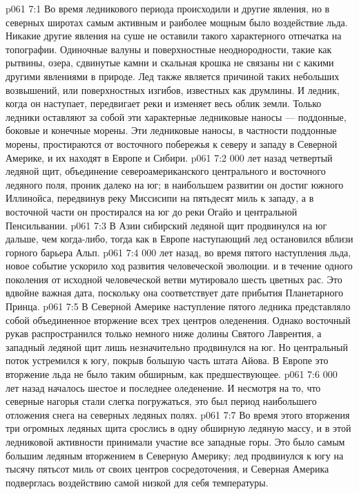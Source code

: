 \vs p061 7:1 Во время ледникового периода происходили и другие явления, но в северных широтах самым активным и раиболее мощным было воздействие льда. Никакие другие явления на суше не оставили такого характерного отпечатка на топографии. Одиночные валуны и поверхностные неоднородности, такие как рытвины, озера, сдвинутые камни и скальная крошка не связаны ни с какими другими явлениями в природе. Лед также является причиной таких небольших возвышений, или поверхностных изгибов, известных как друмлины. И ледник, когда он наступает, передвигает реки и изменяет весь облик земли. Только ледники оставляют за собой эти характерные ледниковые наносы --- поддонные, боковые и конечные морены. Эти ледниковые наносы, в частности поддонные морены, простираются от восточного побережья к северу и западу в Северной Америке, и их находят в Европе и Сибири.
\vs p061 7:2  000 лет назад четвертый ледяной щит, объединение североамериканского центрального и восточного ледяного поля, проник далеко на юг; в наибольшем развитии он достиг южного Иллинойса, передвинув реку Миссисипи на пятьдесят миль к западу, а в восточной части он простирался на юг до реки Огайо и центральной Пенсильвании.
\vs p061 7:3 В Азии сибирский ледяной щит продвинулся на юг дальше, чем когда\hyp{}либо, тогда как в Европе наступающий лед остановился вблизи горного барьера Альп.
\vs p061 7:4  000 лет назад, во время пятого наступления льда, новое событие ускорило ход развития человеческой эволюции.  и в течение одного поколения от исходной человеческой ветви мутировало шесть цветных рас. Это вдвойне важная дата, поскольку она соответствует дате прибытия Планетарного Принца.
\vs p061 7:5 В Северной Америке наступление пятого ледника представляло собой объединенное вторжение всех трех центров оледенения. Однако восточный рукав распространился только немного ниже долины Святого Лаврентия, а западный ледяной щит лишь незначительно продвинулся на юг. Но центральный поток устремился к югу, покрыв большую часть штата Айова. В Европе это вторжение льда не было таким обширным, как предшествующее.
\vs p061 7:6  000 лет назад началось шестое и последнее оледенение. И несмотря на то, что северные нагорья стали слегка погружаться, это был период наибольшего отложения снега на северных ледяных полях.
\vs p061 7:7 Во время этого вторжения три огромных ледяных щита срослись в одну обширную ледяную массу, и в этой ледниковой активности принимали участие все западные горы. Это было самым большим ледяным вторжением в Северную Америку; лед продвинулся к югу на тысячу пятьсот миль от своих центров сосредоточения, и Северная Америка подверглась воздействию самой низкой для себя температуры.
